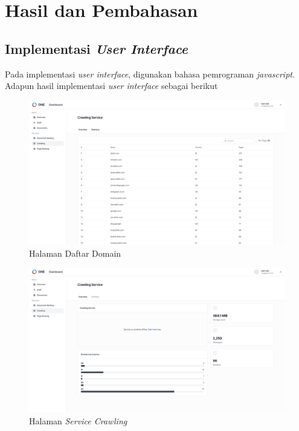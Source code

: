 \documentclass[
	a4paper, %
	10pt, %
	unnumberedsections, %
	twoside, %
]{LTJournalArticle}
\begin{document}
\section{Hasil dan Pembahasan}


\subsection{Implementasi \textit{User Interface}}

Pada implementasi \textit{user interface}, digunakan bahasa pemrograman \textit{javascript}. Adapun hasil implementasi \textit{user interface} sebagai berikut

\begin{figure}[H]
	\includegraphics[width=\linewidth]{view_crawling_domain_list.png}
	\caption{Halaman Daftar Domain}
	\label{gambar:halaman_daftar_domain}
\end{figure}
\begin{figure}[H]
	\includegraphics[width=\linewidth]{view_dashboard_services_crawling_overview.png}
	\caption{Halaman \textit{Service Crawling}}
	\label{gambar:halaman_dashboard_service_crawling}
\end{figure}
\end{document}
